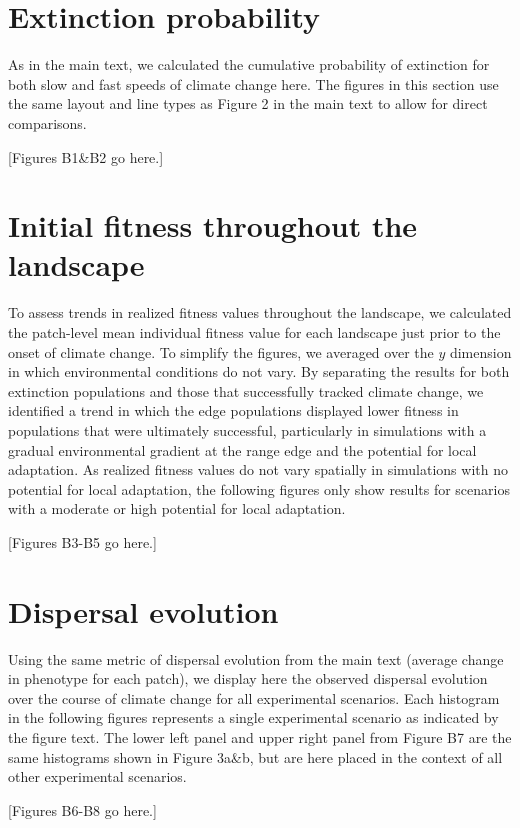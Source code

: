 \documentclass[11pt]{article}
\begin{document}
\section*{Extinction probability}
As in the main text, we calculated the cumulative probability of extinction for both slow and fast speeds of climate change here. The figures in this section use the same layout and line types as Figure 2 in the main text to allow for direct comparisons.

[Figures B1\&B2 go here.]

\section*{Initial fitness throughout the landscape}
To assess trends in realized fitness values throughout the landscape, we calculated the patch-level mean individual fitness value for each landscape just prior to the onset of climate change. To simplify the figures, we averaged over the $y$ dimension in which environmental conditions do not vary. By separating the results for both extinction populations and those that successfully tracked climate change, we identified a trend in which the edge populations displayed lower fitness in populations that were ultimately successful, particularly in simulations with a gradual environmental gradient at the range edge and the potential for local adaptation. As realized fitness values do not vary spatially in simulations with no potential for local adaptation, the following figures only show results for scenarios with a moderate or high potential for local adaptation.

[Figures B3-B5 go here.]

\section*{Dispersal evolution}
Using the same metric of dispersal evolution from the main text (average change in phenotype for each patch), we display here the observed dispersal evolution over the course of climate change for all experimental scenarios. Each histogram in the following figures represents a single experimental scenario as indicated by the figure text. The lower left panel and upper right panel from Figure B7 are the same histograms shown in Figure 3a\&b, but are here placed in the context of all other experimental scenarios.

[Figures B6-B8 go here.]
\end{document}

